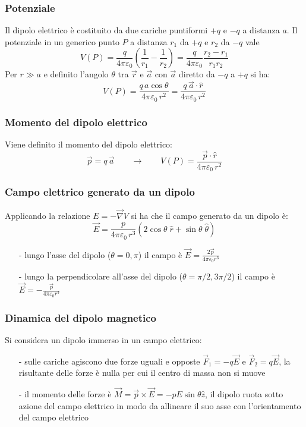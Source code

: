 \documentclass[a4paper]{article}
\newcommand\nab{\vec{\nabla}} %
\begin{document}
\subsubsection*{Potenziale}
Il dipolo elettrico è costituito da due cariche puntiformi \(+q\) e \(-q\) a distanza \(a\). Il potenziale in un generico punto
\(P\) a distanza \(r_1\) da \(+q\) e \(r_2\) da \(-q\) vale 
\[V(P) = \frac{q}{4 \pi \varepsilon_0} \left(\frac{1}{r_1} - \frac{1}{r_2}\right) = \frac{q}{4 \pi \varepsilon_0} \frac{r_2 - r_1}{r_1 r_2}\]
Per \(r \gg a\) e definito l'angolo \(\theta\) tra \(\vec{r}\) e \(\vec{a}\) con \(\vec{a}\) diretto da \(-q\) a \(+q\) si ha:
\[V(P) = \frac{q \, a \cos\theta}{4 \pi \varepsilon_0 \, r^2} = \frac{q \, \vec{a} \cdot \hat{r}}{4 \pi \varepsilon_0 \, r^2}\]

\subsubsection*{Momento del dipolo elettrico}
Viene definito il momento del dipolo elettrico:
\[\vec{p} = q \, \vec{a} \qquad \rightarrow \qquad V(P) = \frac{\vec{p} \cdot \hat{r}}{4 \pi \varepsilon_0 \, r^2}\]

\subsubsection*{Campo elettrico generato da un dipolo}
Applicando la relazione \(E = - \nab V\) si ha che il campo generato da un dipolo è: 
\[\vec{E} = \frac{p}{4 \pi \varepsilon_0 \, r^3} (2 \cos \theta \; \hat{r} + \sin \theta \; \hat{\theta})\]

\begin{itemize}[topsep=3pt, itemsep=0pt]
	\item[-] lungo l'asse del dipolo (\(\theta = 0, \pi\)) il campo è \(\displaystyle \vec{E} = \frac{2 \vec{p}}{4 \pi \varepsilon_0 r^3}\)
	\item[-] lungo la perpendicolare all'asse del dipolo (\(\theta = \pi/2, 3\pi/2\)) il campo è \(\displaystyle \vec{E} = -\frac{\vec{p}}{4 \pi \varepsilon_0 r^3}\)
\end{itemize}

\subsubsection*{Dinamica del dipolo magnetico}
Si considera un dipolo immerso in un campo elettrico:
\begin{itemize}[topsep=3pt, itemsep=0pt]
	\item[-] sulle cariche agiscono due forze uguali e opposte \(\vec{F}_1 = -q\vec{E}\) e \(\vec{F}_2 = q\vec{E}\), la risultante
	delle forze è nulla per cui il centro di massa non si muove
	\item[-] il momento delle forze è \(\vec{M} = \vec{p} \times \vec{E} = -p E \sin \theta \hat{z}\), il dipolo ruota sotto azione
	del campo elettrico in modo da allineare il suo asse con l'orientamento del campo elettrico
\end{itemize}
\end{document}
